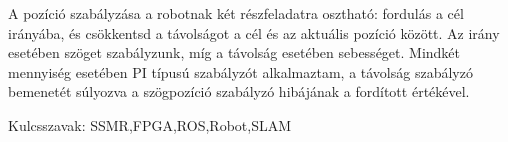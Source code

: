 \begin{titlepage}
A  pozíció szabályzása a robotnak két részfeladatra osztható: fordulás a  cél irányába, és csökkentsd a távolságot a cél és az aktuális pozíció között. Az irány esetében szöget szabályzunk, míg a távolság esetében sebességet. Mindkét mennyiség esetében PI típusú szabályzót alkalmaztam, a távolság szabályzó bemenetét súlyozva a szögpozíció szabályzó hibájának a fordított értékével.






Kulcsszavak: SSMR,FPGA,ROS,Robot,SLAM

\end{titlepage}
